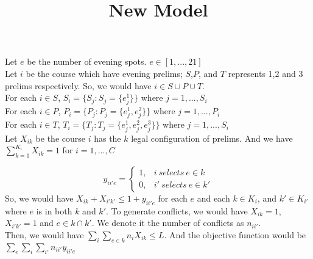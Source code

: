 \documentclass[11pt]{article}
\begin{document}
\begin{spacing}{1.5}
\title{New Model}
\maketitle
\hfill \break
Let $e$ be the number of evening spots. $e \in [1,...,21]$\\
Let $i$ be the course which have evening prelims; $S$,$P$, and $T$ represents 1,2 and 3 prelims respectively. So, we would have $i \in S \cup P \cup T$.\\
\hfill \break
For each $i \in S$, $S_{i}=\{S_{j}:S_{j}=\{e_{j} ^1\}\}$ where $j=1,...,S_{i}$\\
For each $i \in P$, $P_{i}=\{P_{j}:P_{j}=\{e_{j} ^1, e_{j} ^2\}\}$ where $j=1,...,P_{i}$\\
For each $i \in T$, $T_{i}=\{T_{j}:T_{j}=\{e_{j} ^1, e_{j} ^2, e_{j} ^3\}\}$ where $j=1,...,S_{i}$\\
\hfill \break
Let $X_{ik}$ be the course $i$ has the $k$ legal configuration of prelims. And we have $\sum_{k=1}^{K_{i}} X_{ik} =1$ for $i=1,...,C$\par
\[y_{ii'e} =\begin{cases}
						1, & i ~selects ~ e\in k\\
						0,  & i'~ selects ~ e\in k'
						\end{cases}\]
So, we would have $X_{ik} + X_{i'k'} \leq 1+y_{ii'e}$ for each $e$ and each $k \in K_{i}$, and $k' \in K_{i'}$ where $e$ is in both $k$ and $k'$. To generate conflicts, we would have $X_{ik}=1$, $X_{i'k'}=1$ and $e \in k \cap k'$. We denote it the number of conflicts as $n_{ii'}$.\\
\hfill \break
Then, we would have $\sum_{i} \sum_{e \in k} n_{i}X_{ik} \leq L$. And the objective function would be $\sum_{e} \sum_{i} \sum_{i'} n_{ii'}y_{ii'e}$\\
		
						
\end{spacing}
\end{document}
